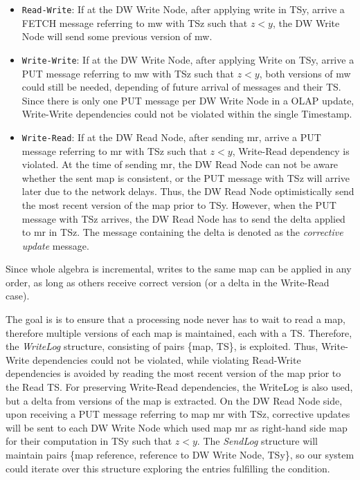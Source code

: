 \documentclass{sig-semester}
\def\OLAP{OLAP\xspace}
\begin{document}
\begin{itemize} 
 \item \texttt{Read-Write}:  If at the DW Write Node, after applying write in TSy, arrive a FETCH message referring to mw with TSz such that $z<y$, the DW Write Node will send some previous version of mw.

 \item \texttt{Write-Write}: If at the DW Write Node, after applying Write on TSy, arrive a PUT message referring to mw with TSz such that $z<y$, both versions of mw could still be needed, depending of future arrival of messages and their TS. Since there is only one PUT message per DW Write Node in a \OLAP update, Write-Write dependencies could not be violated within the single Timestamp.
 
 \item \texttt{Write-Read}:  If at the DW Read Node, after sending mr, arrive a PUT message referring to mr with TSz such that $z<y$, Write-Read dependency is violated. At the time of sending mr, the DW Read Node can not be aware whether the sent map is consistent, or the PUT message with TSz will arrive later due to the network delays. Thus, the DW Read Node optimistically send the most recent version of the map prior to TSy. However, when the PUT message with TSz arrives, the DW Read Node has to send the delta applied to mr in TSz. The message containing the delta is denoted as the \textit{corrective update} message.

\end{itemize}

Since whole algebra is incremental, writes to the same map can be applied in any order, as long as others receive correct version (or a delta in the Write-Read case).

The goal is is to ensure that a processing node never has to wait to read a map, therefore multiple versions of each map is maintained, each with a TS. Therefore, the \textit{WriteLog} structure, consisting of pairs \{map, TS\}, is exploited. Thus, Write-Write dependencies could not be violated, while violating Read-Write dependencies is avoided by reading the most recent version of the map prior to the Read TS. For preserving Write-Read dependencies, the WriteLog is also used, but a delta from versions of the map is extracted. On the DW Read Node side, upon receiving a PUT message referring to map mr with TSz, corrective updates will be sent to each DW Write Node which used map mr as right-hand side map for their computation in TSy such that $z<y$. The \textit{SendLog} structure will maintain pairs \{map reference, reference to DW Write Node, TSy\}, so our system could iterate over this structure exploring the entries fulfilling the condition.
\end{document}
